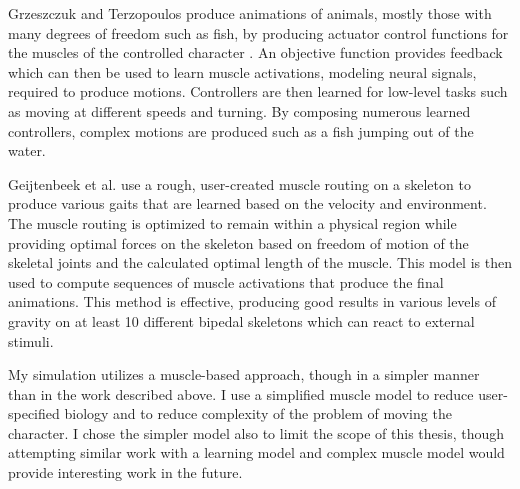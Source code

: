 Grzeszczuk and Terzopoulos produce animations of animals, mostly those with many degrees of freedom such as fish, by producing actuator control functions for the muscles of the controlled character \cite{fish_muscles}.  An objective function provides feedback which can then be used to learn muscle activations, modeling neural signals, required to produce motions.  Controllers are then learned for low-level tasks such as moving at different speeds and turning.  By composing numerous learned controllers, complex motions are produced such as a fish jumping out of the water.

Geijtenbeek et al.\cite{muscle_based_bipeds} use a rough, user-created muscle routing on a skeleton to produce various gaits that are learned based on the velocity and environment.  The muscle routing is optimized to remain within a physical region while providing optimal forces on the skeleton based on freedom of motion of the skeletal joints and the calculated optimal length of the muscle.  This model is then used to compute sequences of muscle activations that produce the final animations.  This method is effective, producing good results in various levels of gravity on at least 10 different bipedal skeletons which can react to external stimuli.

My simulation utilizes a muscle-based approach, though in a simpler manner than in the work described above.  I use a simplified muscle model to reduce user-specified biology and to reduce complexity of the problem of moving the character. I chose the simpler model also to limit the scope of this thesis, though attempting similar work with a learning model and complex muscle model would provide interesting work in the future.

		


